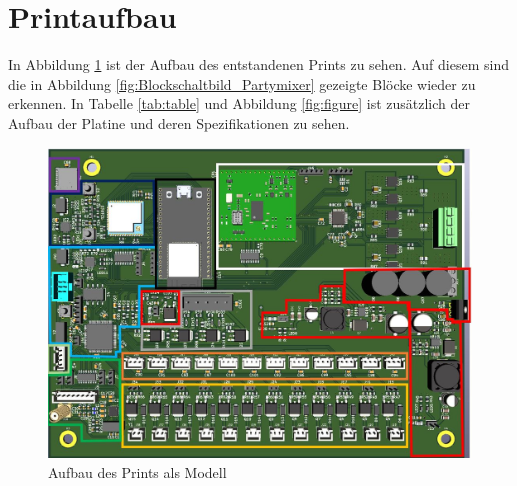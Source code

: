 \newpage
\section{Printaufbau}
\label{sec:Printaufbau}

In Abbildung \ref{fig:Print_3D} ist der Aufbau des entstandenen Prints zu sehen. Auf diesem sind die in Abbildung  \ref{fig:Blockschaltbild_Partymixer} gezeigte Blöcke wieder zu erkennen. In Tabelle \ref{tab:table} und Abbildung \ref{fig:figure} ist zusätzlich der Aufbau der Platine und deren Spezifikationen zu sehen.

\begin{figure}[H]
	\centering
	\includegraphics[width=\textwidth]{graphics/Printteile}
	\caption{Aufbau des Prints als Modell}
	\label{fig:Print_3D}
\end{figure} 

